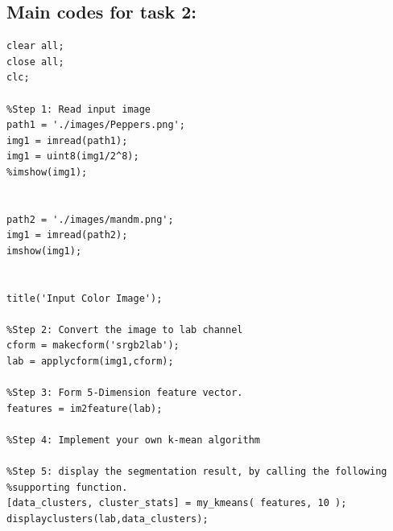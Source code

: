 \documentclass{article}
\begin{document}
\subsection*{Main codes for task 2:}
\begin{lstlisting}
clear all;
close all;
clc;

%Step 1: Read input image
path1 = './images/Peppers.png';
img1 = imread(path1);
img1 = uint8(img1/2^8);
%imshow(img1);


path2 = './images/mandm.png';
img1 = imread(path2);
imshow(img1);


title('Input Color Image');

%Step 2: Convert the image to lab channel
cform = makecform('srgb2lab');
lab = applycform(img1,cform);

%Step 3: Form 5-Dimension feature vector.
features = im2feature(lab);

%Step 4: Implement your own k-mean algorithm 

%Step 5: display the segmentation result, by calling the following
%supporting function.
[data_clusters, cluster_stats] = my_kmeans( features, 10 );
displayclusters(lab,data_clusters);

\end{lstlisting}
\end{document}
